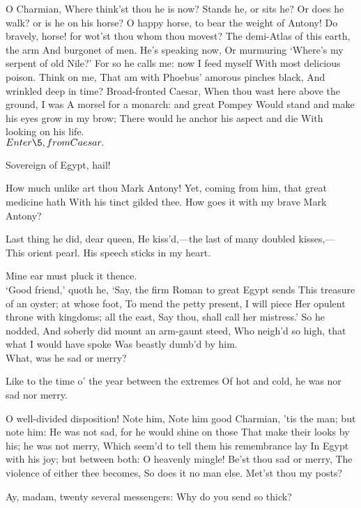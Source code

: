 \documentclass{book}
\begin{document}
\2	O Charmian,
	Where think'st thou he is now? Stands he, or sits he?
	Or does he walk? or is he on his horse?
	O happy horse, to bear the weight of Antony!
	Do bravely, horse! for wot'st thou whom thou movest?
	The demi-Atlas of this earth, the arm
	And burgonet of men. He's speaking now,
	Or murmuring `Where's my serpent of old Nile?'
	For so he calls me: now I feed myself
	With most delicious poison. Think on me,
	That am with Phoebus' amorous pinches black,
	And wrinkled deep in time? Broad-fronted Caesar,
	When thou wast here above the ground, I was
	A morsel for a monarch: and great Pompey
	Would stand and make his eyes grow in my brow;
	There would he anchor his aspect and die
	With looking on his life. \\

	\(Enter \5, from Caesar.\)

\5	Sovereign of Egypt, hail!

\2	How much unlike art thou Mark Antony!
	Yet, coming from him, that great medicine hath
	With his tinct gilded thee.
	How goes it with my brave Mark Antony?

\5	Last thing he did, dear queen,
	He kiss'd,---the last of many doubled kisses,---
	This orient pearl. His speech sticks in my heart.

\2	Mine ear must pluck it thence. \\

\5	`Good friend,' quoth he,
	`Say, the firm Roman to great Egypt sends
	This treasure of an oyster; at whose foot,
	To mend the petty present, I will piece
	Her opulent throne with kingdoms; all the east,
	Say thou, shall call her mistress.' So he nodded,
	And soberly did mount an arm-gaunt steed,
	Who neigh'd so high, that what I would have spoke
	Was beastly dumb'd by him. \\

\2	What, was he sad or merry?

\5	Like to the time o' the year between the extremes
	Of hot and cold, he was nor sad nor merry.

\2	O well-divided disposition! Note him,
	Note him good Charmian, 'tis the man; but note him:
	He was not sad, for he would shine on those
	That make their looks by his; he was not merry,
	Which seem'd to tell them his remembrance lay
	In Egypt with his joy; but between both:
	O heavenly mingle! Be'st thou sad or merry,
	The violence of either thee becomes,
	So does it no man else. Met'st thou my posts?

\5	Ay, madam, twenty several messengers:
	Why do you send so thick? \\
\end{document}
